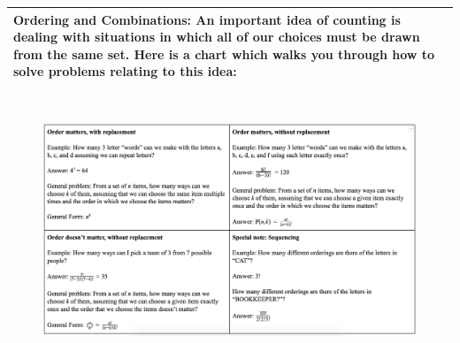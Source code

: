 {
\tabulinesep=1mm
 \begin{tabu}{|p{16cm} |}
 \hline
\vspace{2 mm}
\textbf{Ordering and Combinations:} \newline
An important idea of counting is dealing with situations in which all of our choices must be drawn from the same set. Here is a chart which walks you through how to solve problems relating to this idea: \newline
\\
\hline
 \end{tabu}
}

\begin{figure}[!ht]
\includegraphics[width=16.5cm, height=8cm]{counting_chart.png}
\end{figure}
